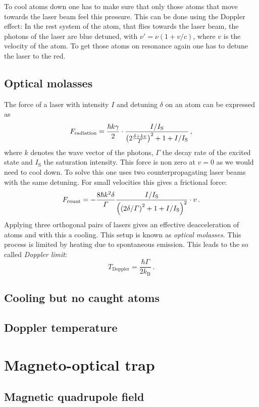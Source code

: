 \documentclass[11pt, english, fleqn, DIV=15, headinclude, BCOR=2cm]{scrreprt}
\begin{document}
To cool atoms down one has to make sure that only those atoms that move
towards the laser beam feel this pressure. This can be done using the Doppler
effect: In the rest system of the atom, that flies towards the laser beam, the
photons of the laser are blue detuned, with $\nu'=\nu(1+v/c)$, where $v$ is
the velocity of the atom. To get those atoms on resonance again one has to
detune the laser to the red.

\subsection{Optical molasses}

The force of a laser with intensity $I$ and detuning $\delta$ on an atom can be expressed as
\[
    F_\text{radiation} = \frac{\hbar k\gamma}2\cdot\frac{I/I_\text{S}}{\left( 2\frac{\delta +
    kv}\Gamma \right)^2 + 1 + I/I_\text{S}}\, ,
\]
where $k$ denotes the wave vector of the photons, $\Gamma$ the decay rate of the
excited state and $I_\text{S}$ the saturation intensity. This force is non zero
at $v=0$ as we would need to cool down. To solve this one uses two
counterpropagating laser beams with the same detuning. For small velocities
this gives a frictional force:
\[
    F_\text{count} = -\frac{8\hbar k^2\delta}{\Gamma}
    \frac{I/I_\text{S}}{\left( \left( 2\delta/\Gamma \right)^2 + 1 + I/I_\text{S} \right)^2}
    \cdot v \, .
\]
Applying three orthogonal pairs of lasers gives an effective deacceleration of
atoms and with this a cooling. This setup is known as \emph{optical molasses}.
This process is limited by heating due to spontaneous emission. This leads to
the so called \emph{Doppler limit}:
\[
    T_\text{Doppler} = \frac{\hbar \Gamma}{2k_\text{B}} \, .
\]

\subsection{Cooling but no caught atoms}

\subsection{Doppler temperature}

\section{Magneto-optical trap}

\subsection{Magnetic quadrupole field}
\end{document}
